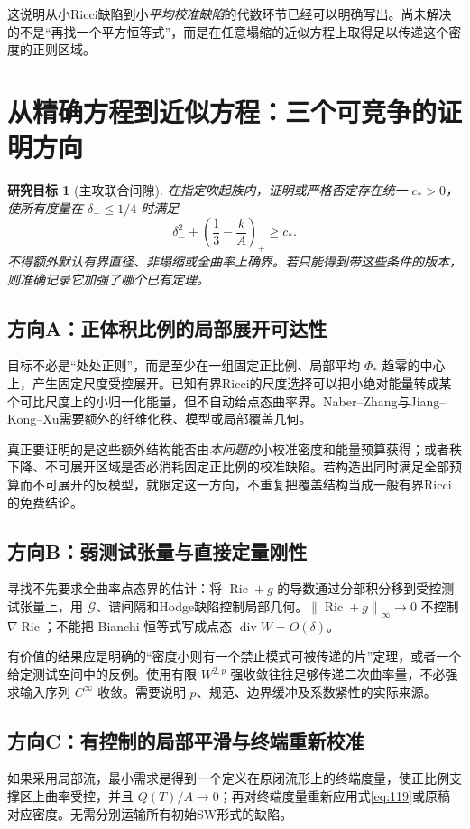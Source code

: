 \documentclass[UTF8,a4paper,11pt,fontset=fandol]{ctexart}
\numberwithin{equation}{section}
\newtheorem{target}[theorem]{研究目标}
\theoremstyle{definition}
\newcommand{\Ric}{\operatorname{Ric}}
\newcommand{\norm}[1]{\left\lVert#1\right\rVert}
\begin{document}
这说明从小Ricci缺陷到小\emph{平均校准缺陷}的代数环节已经可以明确写出。尚未解决的不是“再找一个平方恒等式”，而是在任意塌缩的近似方程上取得足以传递这个密度的正则区域。

\section{从精确方程到近似方程：三个可竞争的证明方向}
\begin{target}[主攻联合间隙]\label{tar:joint}
在指定吹起族内，证明或严格否定存在统一 $c_*>0$，使所有度量在 $\delta_-\le1/4$ 时满足
\begin{equation}\label{eq:joint}
\delta_-^2+\left(\frac13-\frac{k}{A}\right)_+\ge c_*.
\end{equation}
不得额外默认有界直径、非塌缩或全曲率上确界。若只能得到带这些条件的版本，则准确记录它加强了哪个已有定理。
\end{target}

\subsection{方向A：正体积比例的局部展开可达性}
目标不必是“处处正则”，而是至少在一组固定正比例、局部平均 $\Phi_*$ 趋零的中心上，产生固定尺度受控展开。已知有界Ricci的尺度选择\cite[Theorem 3.4]{GJ2017}可以把小绝对能量转成某个可比尺度上的小归一化能量，但不自动给点态曲率界。Naber--Zhang与Jiang--Kong--Xu需要额外的纤维化秩、模型或局部覆盖几何\cite{NZ,JKX}。

真正要证明的是这些额外结构能否由\emph{本问题的}小校准密度和能量预算获得；或者秩下降、不可展开区域是否必消耗固定正比例的校准缺陷。若构造出同时满足全部预算而不可展开的反模型，就限定这一方向，不重复把覆盖结构当成一般有界Ricci的免费结论。

\subsection{方向B：弱测试张量与直接定量刚性}
寻找不先要求全曲率点态界的估计：将 $\Ric+g$ 的导数通过分部积分移到受控测试张量上，用 $\mathcal G$、谱间隔和Hodge缺陷控制局部几何。$\norm{\Ric+g}_\infty\to0$ 不控制 $\nabla\Ric$；不能把 Bianchi 恒等式写成点态 $\operatorname{div}W=O(\delta)$。

有价值的结果应是明确的“密度小则有一个禁止模式可被传递的片”定理，或者一个给定测试空间中的反例。使用有限 $W^{2,p}$ 强收敛往往足够传递二次曲率量，不必强求输入序列 $C^\infty$ 收敛。需要说明 $p$、规范、边界缓冲及系数紧性的实际来源。

\subsection{方向C：有控制的局部平滑与终端重新校准}
如果采用局部流，最小需求是得到一个定义在原闭流形上的终端度量，使正比例支撑区上曲率受控，并且 $Q(T)/A\to0$；再对终端度量重新应用式\eqref{eq:119}或原稿对应密度。无需分别运输所有初始SW形式的缺陷。
\end{document}
